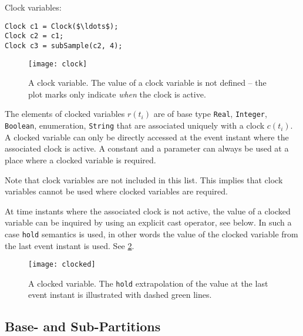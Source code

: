 \begin{example}
Clock variables:
\begin{lstlisting}[language=modelica]
Clock c1 = Clock($\ldots$);
Clock c2 = c1;
Clock c3 = subSample(c2, 4);
\end{lstlisting}
\end{example}

\begin{figure}[H]
  \begin{center}
    \texttt{[image: clock]}
  \end{center}
  \caption{
    A clock variable.
    The value of a clock variable is not defined -- the plot marks only indicate \emph{when} the clock is active.
  }
  \label{fig:clock-variable}
\end{figure}

\begin{definition}\label{def:clocked-variable}
The elements of clocked variables $r(t_{i})$ are of base type \lstinline!Real!, \lstinline!Integer!, \lstinline!Boolean!, enumeration, \lstinline!String! that are associated uniquely with a clock $c(t_{i})$.
A clocked variable can only be directly accessed at the event instant where the associated clock is active.
A constant and a parameter can always be used at a place where a clocked variable is required.
\begin{nonnormative}
Note that clock variables are not included in this list.
This implies that clock variables cannot be used where clocked variables are required.
\end{nonnormative}

At time instants where the associated clock is not active, the value of a clocked variable can be inquired by using an explicit cast operator, see below.
In such a case \lstinline!hold! semantics is used, in other words the value of the clocked variable from the last event instant is used.
See \cref{fig:clocked-variable}.
\end{definition}

\begin{figure}[H]
  \begin{center}
    \texttt{[image: clocked]}
  \end{center}
  \caption{
    A clocked variable.
    The \lstinline!hold! extrapolation of the value at the last event instant is illustrated with dashed green lines.
  }
  \label{fig:clocked-variable}
\end{figure}

\subsection{Base- and Sub-Partitions}\label{base-clock-and-sub-clock-partitions}


